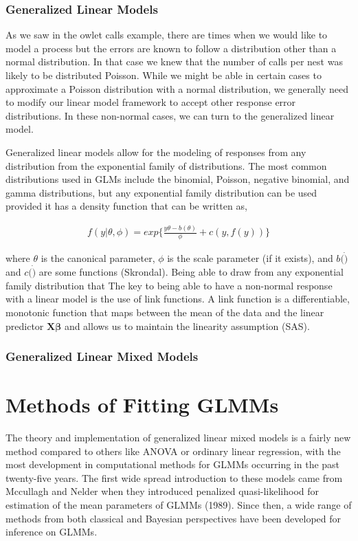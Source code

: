 \documentclass{article}\usepackage[]{graphicx}\usepackage[]{color}
\begin{document}
\subsubsection{Generalized Linear Models}

As we saw in the owlet calls example, there are times when we would like to model a process but the errors are known to follow a distribution other than a normal distribution. In that case we knew that the number of calls per nest was likely to be distributed Poisson. While we might be able in certain cases to approximate a Poisson distribution with a normal distribution, we generally need to modify our linear model framework to accept other response error distributions. In these non-normal cases, we can turn to the generalized linear model.

Generalized linear models allow for the modeling of responses from any distribution from the exponential family of distributions. The most common distributions used in GLMs include the binomial, Poisson, negative binomial, and gamma distributions, but any exponential family distribution can be used provided it has a density function that can be written as,

\begin{align}
f(y|\theta, \phi) = exp\Big\{\frac{y\theta-b(\theta)}{\phi} + c(y,f(y)) \Big\}
\end{align}

where $\theta$ is the canonical parameter, $\phi$ is the scale parameter (if it exists), and $b(\dot)$ and $c(\dot)$ are some functions (Skrondal). Being able to draw from any exponential family distribution that  The key to being able to have a non-normal response with a linear model is the use of link functions. A link function is a differentiable, monotonic function that maps between the mean of the data and the linear predictor $\bm{X\beta}$ and allows us to maintain the linearity assumption (SAS). 

\subsubsection{Generalized Linear Mixed Models}



\section{Methods of Fitting GLMMs}

The theory and implementation of generalized linear mixed models is a fairly new method compared to others like ANOVA or ordinary linear regression, with the most development in computational methods for GLMMs occurring in the past twenty-five years. The first wide spread introduction to these models came from Mccullagh and Nelder when they introduced penalized quasi-likelihood for estimation of the mean parameters of GLMMs (1989). Since then, a wide range of methods from both classical and Bayesian perspectives have been developed for inference on GLMMs.
\end{document}
